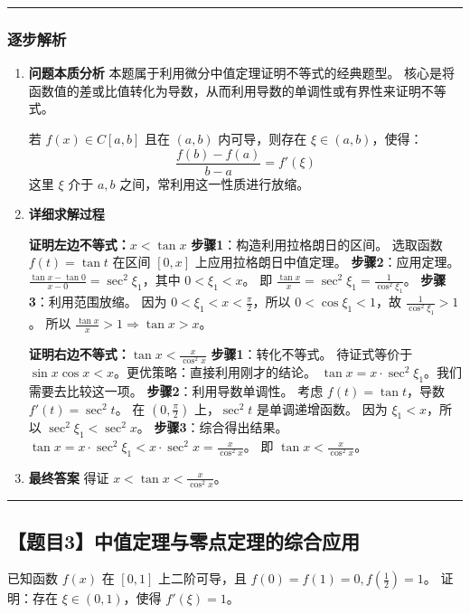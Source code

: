 \documentclass[UTF8]{ctexart}
\newenvironment{redenv}{\color{red}}{}
\newenvironment{detailedanalysis}{%
    \color{red}
    \begin{enumerate}[label=\textbf{第\arabic*步：}, leftmargin=*, align=left, itemsep=1.5ex]
}{%
    \end{enumerate}
}
\newcommand{\problemrule}{\noindent\rule{\textwidth}{1.5pt}\vspace{-0.8em}}
\newcommand{\analysisrule}{\noindent\rule{\textwidth}{0.8pt}\vspace{-0.8em}}
\begin{document}
\begin{redenv}
\analysisrule
\subsubsection*{逐步解析}

\begin{detailedanalysis}
\item \textbf{问题本质分析}
本题属于利用微分中值定理证明不等式的经典题型。
核心是将函数值的差或比值转化为导数，从而利用导数的单调性或有界性来证明不等式。
\begin{conceptbox}[拉格朗日定理应用]
若 $f(x) \in C[a, b]$ 且在 $(a, b)$ 内可导，则存在 $\xi \in (a, b)$，使得：
\[ \frac{f(b)-f(a)}{b-a} = f'(\xi) \]
这里 $\xi$ 介于 $a, b$ 之间，常利用这一性质进行放缩。
\end{conceptbox}

\item \textbf{详细求解过程}

\noindent\textbf{证明左边不等式：$x < \tan x$}
\textbf{步骤1}：构造利用拉格朗日的区间。
选取函数 $f(t) = \tan t$ 在区间 $[0, x]$ 上应用拉格朗日中值定理。
\textbf{步骤2}：应用定理。
$\frac{\tan x - \tan 0}{x - 0} = \sec^2 \xi_1$，其中 $0 < \xi_1 < x$。
即 $\frac{\tan x}{x} = \sec^2 \xi_1 = \frac{1}{\cos^2 \xi_1}$。
\textbf{步骤3}：利用范围放缩。
因为 $0 < \xi_1 < x < \frac{\pi}{2}$，所以 $0 < \cos \xi_1 < 1$，故 $\frac{1}{\cos^2 \xi_1} > 1$。
所以 $\frac{\tan x}{x} > 1 \Rightarrow \tan x > x$。

\noindent\textbf{证明右边不等式：$\tan x < \frac{x}{\cos^2 x}$}
\textbf{步骤1}：转化不等式。
待证式等价于 $\sin x \cos x < x$。更优策略：直接利用刚才的结论。
$\tan x = x \cdot \sec^2 \xi_1$。我们需要去比较这一项。
\textbf{步骤2}：利用导数单调性。
考虑 $f(t) = \tan t$，导数 $f'(t) = \sec^2 t$。
在 $(0, \frac{\pi}{2})$ 上，$\sec^2 t$ 是单调递增函数。
因为 $\xi_1 < x$，所以 $\sec^2 \xi_1 < \sec^2 x$。
\textbf{步骤3}：综合得出结果。
$\tan x = x \cdot \sec^2 \xi_1 < x \cdot \sec^2 x = \frac{x}{\cos^2 x}$。
即 $\tan x < \frac{x}{\cos^2 x}$。

\item \textbf{最终答案}
得证 $x < \tan x < \frac{x}{\cos^2 x}$。
\end{detailedanalysis}
\end{redenv}

\vspace{2em}
\problemrule
\subsection*{【题目3】中值定理与零点定理的综合应用}
已知函数 $f(x)$ 在 $[0, 1]$ 上二阶可导，且 $f(0)=f(1)=0, f(\frac{1}{2})=1$。
证明：存在 $\xi \in (0, 1)$，使得 $f'(\xi) = 1$。
\end{document}
